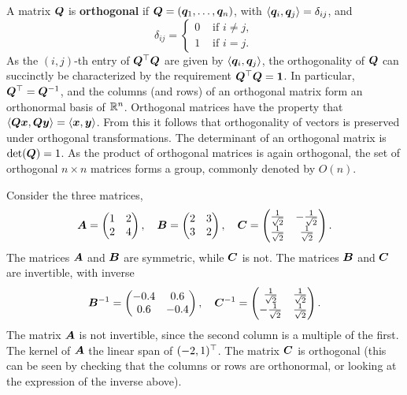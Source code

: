 A matrix $\bm{Q}$ is \textbf{orthogonal} if $\bm{Q}=(\bm{q}_1,\dots,\bm{q}_n)$, with $\langle {\bm{q}_i}, {\bm{q}_j} \rangle=\delta_{ij}$, and
\begin{equation*}
\delta_{ij}=\begin{cases} 0 &\text{ if } i\neq j,\\
             1 &\text{ if } i=j.
            \end{cases}
\end{equation*}
As the $(i,j)$-th entry of $\bm{Q}^{\top}\bm{Q}$ are given by $\langle {\bm{q}_i}, {\bm{q}_j} \rangle$, the orthogonality of $\bm{Q}$ can succinctly be characterized by the requirement $\bm{Q}^{\top}\bm{Q}=\bm{1}$. In particular, $\bm{Q}^{\top}=\bm{Q}^{-1}$, and the columns (and rows) of an orthogonal matrix form an orthonormal basis of $\mathbb{R}^n$. 
Orthogonal matrices have the property that $\langle {\bm{Q}\bm{x}}, {\bm{Q}\bm{y}} \rangle=\langle {\bm{x}}, {\bm{y}} \rangle$. 
From this it follows that orthogonality of vectors is preserved under orthogonal transformations. The determinant of an orthogonal matrix is $\det(\bm{Q})=1$.
As the product of orthogonal matrices is again orthogonal, the set of orthogonal $n\times n$ matrices forms a group, commonly denoted by $O(n)$.

\begin{example}
Consider the three matrices,
\begin{equation*}
 \bm{A} = \begin{pmatrix}
 1 & 2\\
 2 & 4
 \end{pmatrix}, \quad
 \bm{B}=\begin{pmatrix}
 2 & 3\\
 3 & 2
 \end{pmatrix},
 \quad
 \bm{C} = \begin{pmatrix}
 \frac{1}{\sqrt{2}}&-\frac{1}{\sqrt{2}}\\
 \frac{1}{\sqrt{2}}& \frac{1}{\sqrt{2}}
 \end{pmatrix}.
\end{equation*}
The matrices $\bm{A}$ and $\bm{B}$ are symmetric, while $\bm{C}$ is not. The matrices $\bm{B}$ and $\bm{C}$ are invertible, with inverse
\begin{equation*}
  \bm{B}^{-1} = \begin{pmatrix}
  -0.4 & 0.6\\
  0.6 & -0.4
  \end{pmatrix}, \quad
  \bm{C}^{-1} = \begin{pmatrix}
  \frac{1}{\sqrt{2}}&\frac{1}{\sqrt{2}}\\
 -\frac{1}{\sqrt{2}}& \frac{1}{\sqrt{2}}
  \end{pmatrix}.
\end{equation*}
The matrix $\bm{A}$ is not invertible, since the second column is a multiple of the first. The kernel of $\bm{A}$ the linear span of $(-2,1)^{\top}$. The matrix $\bm{C}$ is orthogonal (this can be seen by checking that the columns or rows are orthonormal, or looking at the expression of the inverse above). 
\end{example}

